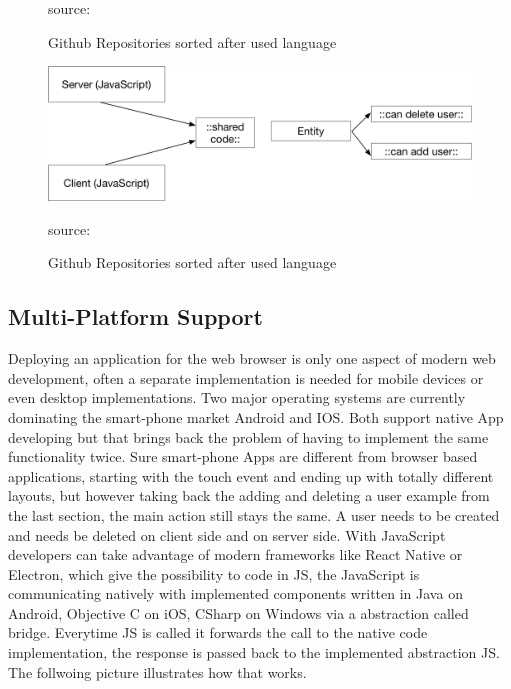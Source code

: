 \begin{figure}
	\centering
	
	\caption{Github Repositories sorted after used language} source:\cite{JS}
	\label{fig:JS}
\end{figure}
\begin{figure}
	\centering
	\includegraphics[scale=0.5]{bilder/grundlagen/Entity2.png}
	\caption{Github Repositories sorted after used language} source:\cite{JS}
	\label{fig:JS}
\end{figure}


\subsection{Multi-Platform Support}

Deploying an application for the web browser is only one aspect of modern web development, often a separate implementation is needed for mobile devices or even desktop implementations. Two major operating systems are currently dominating the smart-phone market Android and IOS. Both support native App developing but that brings back the problem of having to implement the same functionality twice. Sure smart-phone Apps are different from browser based applications, starting with the touch event and ending up with totally different layouts, but however taking back the adding and deleting a user example from the last section, the main action still stays the same. A user needs to be created and needs be deleted on client side and on server side. With JavaScript developers can take advantage of modern frameworks like React Native or Electron, which give the possibility to code in \gls{JS}, the JavaScript is communicating natively with implemented components written in Java on Android, Objective C on iOS, CSharp on Windows via a abstraction called bridge. Everytime \gls{JS} is called it forwards the call to the native code implementation, the response is passed back to the implemented abstraction \gls{JS}. The follwoing picture illustrates how that works.

